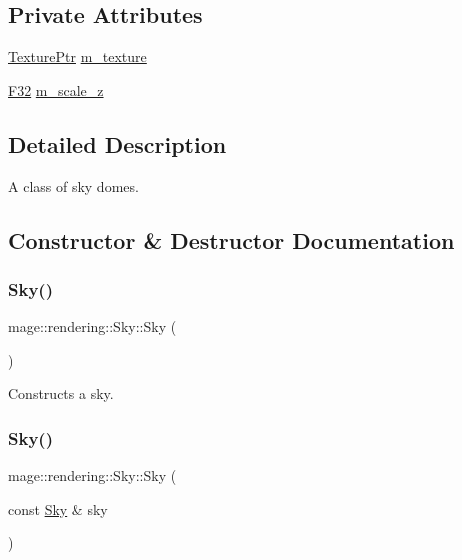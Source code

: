 \subsection*{Private Attributes}
\begin{DoxyCompactItemize}
\item 
\hyperlink{namespacemage_1_1rendering_a6f3ae54f825328465b0cdde0f0de4a36}{Texture\+Ptr} \hyperlink{classmage_1_1rendering_1_1_sky_a674493833d7c13a329ba35429a1d9dfa}{m\+\_\+texture}
\item 
\hyperlink{namespacemage_aa97e833b45f06d60a0a9c4fc22ae02c0}{F32} \hyperlink{classmage_1_1rendering_1_1_sky_a45ba48d9ce09ff566f9edb930d759dba}{m\+\_\+scale\+\_\+z}
\end{DoxyCompactItemize}


\subsection{Detailed Description}
A class of sky domes. 

\subsection{Constructor \& Destructor Documentation}
\hypertarget{classmage_1_1rendering_1_1_sky_a9679ec331c5e0fc01c49760f6e74664d}{}\label{classmage_1_1rendering_1_1_sky_a9679ec331c5e0fc01c49760f6e74664d} 
\subsubsection{\texorpdfstring{Sky()}{Sky()}\hspace{0.1cm}{\footnotesize\ttfamily [1/3]}}
{\footnotesize\ttfamily mage\+::rendering\+::\+Sky\+::\+Sky (\begin{DoxyParamCaption}{ }\end{DoxyParamCaption})}

Constructs a sky. \hypertarget{classmage_1_1rendering_1_1_sky_aeafa720fff92be3f02d484a47443b973}{}\label{classmage_1_1rendering_1_1_sky_aeafa720fff92be3f02d484a47443b973} 
\subsubsection{\texorpdfstring{Sky()}{Sky()}\hspace{0.1cm}{\footnotesize\ttfamily [2/3]}}
{\footnotesize\ttfamily mage\+::rendering\+::\+Sky\+::\+Sky (\begin{DoxyParamCaption}\item[{const \hyperlink{classmage_1_1rendering_1_1_sky}{Sky} \&}]{sky }\end{DoxyParamCaption})\hspace{0.3cm}{\ttfamily [default]}}

